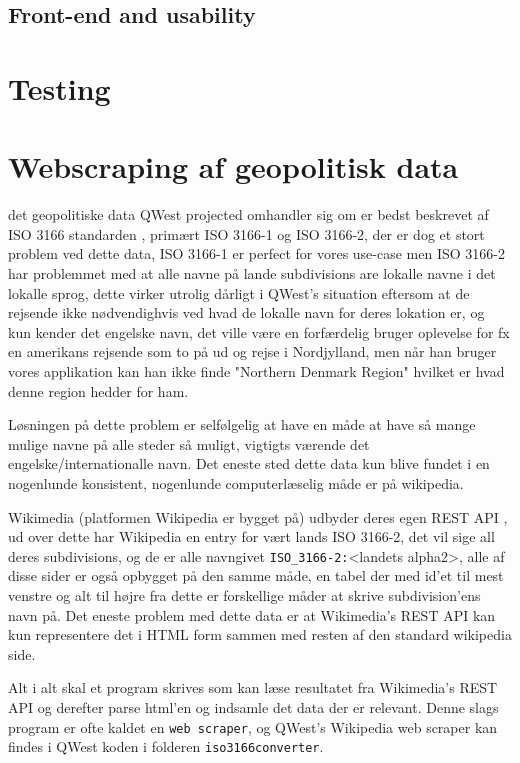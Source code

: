\subsection{Front-end and usability}\label{sec:frontend}


\section{Testing}\label{sec:testing}

\section{Webscraping af geopolitisk data}\label{sec:datascraping}
det geopolitiske data QWest projected omhandler sig om er bedst beskrevet af ISO 3166 standarden \cite{ISO3166}, primært ISO 3166-1 og ISO 3166-2, der er dog et stort problem ved dette data, ISO 3166-1 er perfect for vores use-case men ISO 3166-2 har problemmet med at alle navne på lande subdivisions are lokalle navne i det lokalle sprog, dette virker utrolig dårligt i QWest's situation eftersom at de rejsende ikke nødvendighvis ved hvad de lokalle navn for deres lokation er, og kun kender det engelske navn, det ville være en forfærdelig bruger oplevelse for fx en amerikans rejsende som to på ud og rejse i Nordjylland, men når han bruger vores applikation kan han ikke finde "Northern Denmark Region" hvilket er hvad denne region hedder for ham.

Løsningen på dette problem er selfølgelig at have en måde at have så mange mulige navne på alle steder så muligt, vigtigts værende det engelske/internationalle navn. Det eneste sted dette data kun blive fundet i en nogenlunde konsistent, nogenlunde computerlæselig måde er på wikipedia.

Wikimedia (platformen Wikipedia er bygget på) udbyder deres egen REST API \cite{Wikimedia-REST-API-Documentation}, ud over dette har Wikipedia en entry for vært lands ISO 3166-2, det vil sige all deres subdivisions, og de er alle navngivet \texttt{ISO\_3166-2:}<landets alpha2>, alle af disse sider er også opbygget på den samme måde, en tabel der med id'et til mest venstre og alt til højre fra dette er forskellige måder at skrive subdivision'ens navn på. Det eneste problem med dette data er at Wikimedia's REST API kan kun representere det i HTML form sammen med resten af den standard wikipedia side.

Alt i alt skal et program skrives som kan læse resultatet fra Wikimedia's REST API og derefter parse html'en og indsamle det data der er relevant. 
Denne slags program er ofte kaldet en \texttt{web scraper}, og QWest's Wikipedia web scraper kan findes i QWest koden i folderen \texttt{iso3166converter}.

